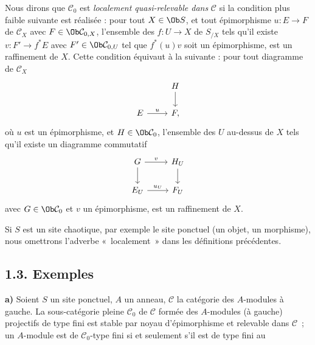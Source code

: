 Nous dirons que \(\mathcal C_0\) est \emph{localement quasi-relevable dans} \(\mathcal C\) si la condition plus faible suivante est réalisée : pour tout \(X\in\Ob S\), et tout épimorphisme \(u:E\longrightarrow F\) de \(\mathcal C_X\) avec \(F\in\Ob\mathcal C_{0,X}\), l'ensemble des \(f:U\to X\) de \(S_{/X}\) tels qu'il existe \(v:F'\longrightarrow f^*E\) avec \(F'\in\Ob\mathcal C_{0,U}\) tel que \(f^*(u)v\) soit un épimorphisme, est un raffinement de \(X\). Cette condition équivaut à la suivante : pour tout diagramme de \(\mathcal C_X\)
\[
\begin{tikzcd}
& H \arrow[d]\\
E \arrow[r,"u"] & F ,
\end{tikzcd}
\]
où \(u\) est un épimorphisme, et \(H\in\Ob\mathcal C_0\), l'ensemble des \(U\) au-dessus de \(X\) tels qu'il existe un diagramme commutatif
\[
\begin{tikzcd}
G \arrow[r,"v"] \arrow[d] & H_U \arrow[d]\\
E_U \arrow[r,"u_U"] & F_U
\end{tikzcd}
\]
avec \(G\in\Ob\mathcal C_0\) et \(v\) un épimorphisme, est un raffinement de \(X\).

Si \(S\) est un site chaotique, par exemple le site ponctuel (un objet, un morphisme), nous omettrons l'adverbe «~localement~» dans les définitions précédentes.

\subsection*{1.3. Exemples}

\textbf{a)} Soient \(S\) un site ponctuel, \(A\) un anneau, \(\mathcal C\) la catégorie des \(A\)-modules à gauche. La sous-catégorie pleine \(\mathcal C_0\) de \(\mathcal C\) formée des \(A\)-modules (à gauche) projectifs de type fini est stable par noyau d'épimorphisme et relevable dans \(\mathcal C\)~; un \(A\)-module est de \(\mathcal C_0\)-type fini si et seulement s'il est de type fini au
